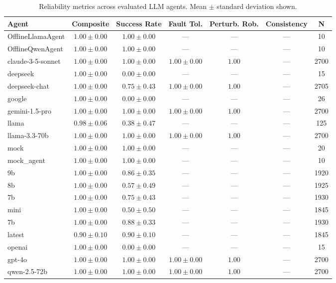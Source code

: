 \begin{table}[t]
\centering
\caption{Reliability metrics across evaluated LLM agents. Mean $\pm$ standard deviation shown.}
\label{tab:reliability}
\begin{tabular}{lcccccc}
\toprule
Agent & Composite & Success Rate & Fault Tol. & Perturb. Rob. & Consistency & N \\
\midrule
OfflineLlamaAgent & $1.00 \pm 0.00$ & $1.00 \pm 0.00$ & --- & --- & --- & 10 \\
OfflineQwenAgent & $1.00 \pm 0.00$ & $1.00 \pm 0.00$ & --- & --- & --- & 10 \\
claude-3-5-sonnet & $1.00 \pm 0.00$ & $1.00 \pm 0.00$ & $1.00 \pm 0.00$ & $1.00$ & --- & 2700 \\
deepseek & $1.00 \pm 0.00$ & $0.00 \pm 0.00$ & --- & --- & --- & 15 \\
deepseek-chat & $1.00 \pm 0.00$ & $0.75 \pm 0.43$ & $1.00 \pm 0.00$ & $1.00$ & --- & 2705 \\
google & $1.00 \pm 0.00$ & $0.00 \pm 0.00$ & --- & --- & --- & 26 \\
gemini-1.5-pro & $1.00 \pm 0.00$ & $1.00 \pm 0.00$ & $1.00 \pm 0.00$ & $1.00$ & --- & 2700 \\
llama & $0.98 \pm 0.06$ & $0.38 \pm 0.47$ & --- & --- & --- & 125 \\
llama-3.3-70b & $1.00 \pm 0.00$ & $1.00 \pm 0.00$ & $1.00 \pm 0.00$ & $1.00$ & --- & 2700 \\
mock & $1.00 \pm 0.00$ & $1.00 \pm 0.00$ & --- & --- & --- & 20 \\
mock_agent & $1.00 \pm 0.00$ & $1.00 \pm 0.00$ & --- & --- & --- & 10 \\
9b & $1.00 \pm 0.00$ & $0.86 \pm 0.35$ & --- & --- & --- & 1920 \\
8b & $1.00 \pm 0.00$ & $0.57 \pm 0.49$ & --- & --- & --- & 1925 \\
7b & $1.00 \pm 0.00$ & $0.75 \pm 0.43$ & --- & --- & --- & 1930 \\
mini & $1.00 \pm 0.00$ & $0.50 \pm 0.50$ & --- & --- & --- & 1845 \\
7b & $1.00 \pm 0.00$ & $0.88 \pm 0.33$ & --- & --- & --- & 1930 \\
latest & $0.90 \pm 0.10$ & $0.90 \pm 0.10$ & --- & --- & --- & 1845 \\
openai & $1.00 \pm 0.00$ & $0.00 \pm 0.00$ & --- & --- & --- & 15 \\
gpt-4o & $1.00 \pm 0.00$ & $1.00 \pm 0.00$ & $1.00 \pm 0.00$ & $1.00$ & --- & 2700 \\
qwen-2.5-72b & $1.00 \pm 0.00$ & $1.00 \pm 0.00$ & $1.00 \pm 0.00$ & $1.00$ & --- & 2700 \\
\bottomrule
\end{tabular}
\end{table}
